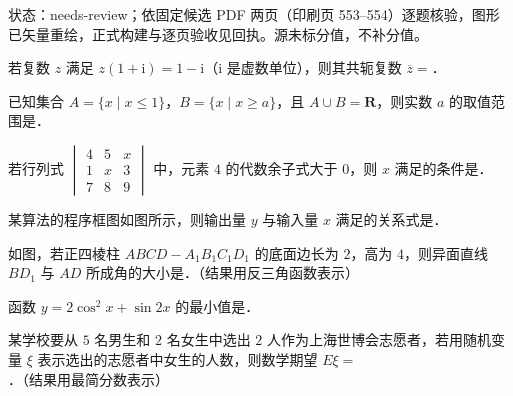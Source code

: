 

状态：needs-review；依固定候选 PDF 两页（印刷页 553–554）逐题核验，图形已矢量重绘，正式构建与逐页验收见回执。源未标分值，不补分值。


\begin{question}
若复数 $z$ 满足 $z(1+\mathrm i)=1-\mathrm i$（$\mathrm i$ 是虚数单位），则其共轭复数 $\overline z=$\gkblank{}．

\end{question}
\begin{question}
已知集合 $A=\{x\mid x\leqslant1\}$，$B=\{x\mid x\geqslant a\}$，且 $A\cup B=\mathbf R$，则实数 $a$ 的取值范围是\gkblank{}．

\end{question}
\begin{question}
若行列式 $\begin{vmatrix}4&5&x\\1&x&3\\7&8&9\end{vmatrix}$ 中，元素 $4$ 的代数余子式大于 $0$，则 $x$ 满足的条件是\gkblank{}．

\Needspace{0.4\textheight}
\end{question}
\begin{question}
某算法的程序框图如图所示，则输出量 $y$ 与输入量 $x$ 满足的关系式是\gkblank{}．
\nopagebreak[4]
\begin{center}\end{center}
\nopagebreak[4]
\Needspace{0.4\textheight}
\end{question}
\begin{question}
如图，若正四棱柱 $ABCD-A_1B_1C_1D_1$ 的底面边长为 $2$，高为 $4$，则异面直线 $BD_1$ 与 $AD$ 所成角的大小是\gkblank{}．（结果用反三角函数表示）
\nopagebreak[4]
\begin{center}\end{center}
\nopagebreak[4]
\end{question}
\begin{question}
函数 $y=2\cos^2x+\sin2x$ 的最小值是\gkblank{}．

\end{question}
\begin{question}
某学校要从 $5$ 名男生和 $2$ 名女生中选出 $2$ 人作为上海世博会志愿者，若用随机变量 $\xi$ 表示选出的志愿者中女生的人数，则数学期望 $E\xi=$\gkblank{}．（结果用最简分数表示）

\end{question}
